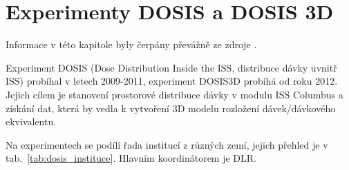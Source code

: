 \chapter{Experimenty DOSIS a DOSIS 3D}
Informace v této kapitole byly čerpány převážně ze zdroje \cite{dosis}.

Experiment DOSIS (Dose Distribution Inside the ISS, distribuce dávky uvnitř ISS) probíhal v letech 2009-2011, experiment DOSIS3D probíhá od roku 2012. Jejich cílem je stanovení prostorové distribuce dávky v modulu ISS Columbus a získání dat, která by vedla k vytvoření 3D modelu rozložení dávek/dávkového ekvivalentu.

Na experimentech se podílí řada institucí z různých zemí, jejich přehled je v tab.~\ref{tab:dosis_instituce}. Hlavním koordinátorem je DLR. 
